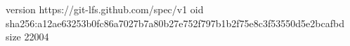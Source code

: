 version https://git-lfs.github.com/spec/v1
oid sha256:a12ae63253b0fc86a7027b7a80b27e752f797b1b2f75e8c3f53550d5e2bcafbd
size 22004
